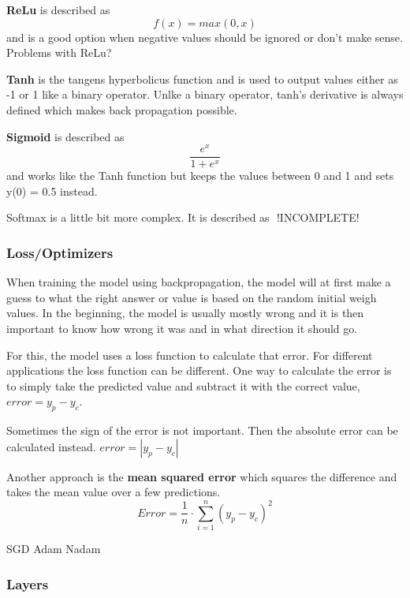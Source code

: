\textbf{ReLu} is described as
\[f(x) = max(0, x)\]
and is a good option when negative values should be ignored or don't make sense. Problems with ReLu?

\textbf{Tanh} is the tangens hyperbolicus function and is used to output values either as -1 or 1 like a binary operator. Unlke a binary operator, tanh's derivative is always defined which makes back propagation possible.

\textbf{Sigmoid} is described as 
\[\frac{e^x}{1+e^x}\]
and works like the Tanh function but keeps the values between 0 and 1 and sets y(0) = 0.5 instead.

Softmax is a little bit more complex. It is described as $  $ !INCOMPLETE!

\subsubsection{Loss/Optimizers}
When training the model using backpropagation, the model will at first make a guess to what the right answer or value is based on the random initial weigh values. In the beginning, the model is usually mostly wrong and it is then important to know how wrong it was and in what direction it should go.

For this, the model uses a loss function to calculate that error. For different applications the loss function can be different.
One way to calculate the error is to simply take the predicted value and subtract it with the correct value, $ error = y_p - y_c $.

Sometimes the sign of the error is not important. Then the absolute error can be calculated instead. $error = |y_p - y_c| $

Another approach is the \textbf{mean squared error} which squares the difference and takes the mean value over a few predictions.
\[Error = \frac{1}{n} \cdot \displaystyle\sum_{i=1}^{n} (y_p - y_c)^{2} \]

SGD
Adam
Nadam

\subsubsection{Layers}

